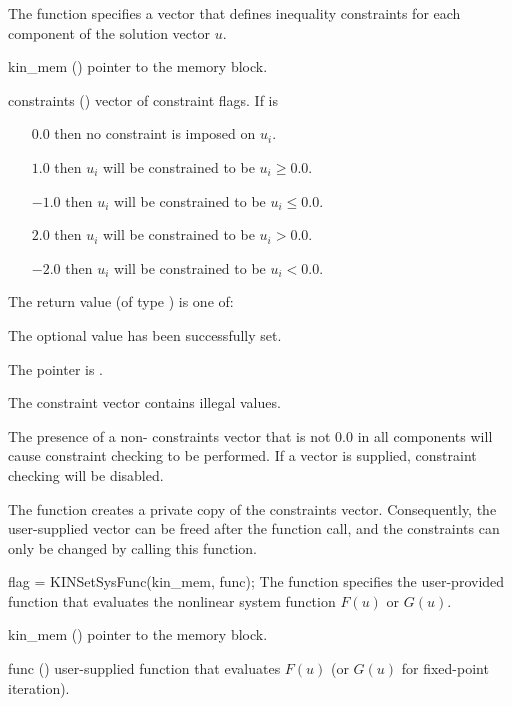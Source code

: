 {
  The function  specifies a vector that defines
  inequality constraints for each component of the solution vector $u$.
}
{
  \begin{args}[constraints]
  \item[kin\_mem] ()
    pointer to the {\kinsol} memory block.
  \item[constraints] ()
    vector of constraint flags. If  is
    \begin{itemize}
    \item[$0.0$] then no constraint is imposed on $u_i$.
    \item[$1.0$] then $u_i$ will be constrained to be $u_i \ge 0.0$.
    \item[$-1.0$] then $u_i$ will be constrained to be $u_i \le 0.0$.
    \item[$2.0$] then $u_i$ will be constrained to be $u_i > 0.0$.
    \item[$-2.0$] then $u_i$ will be constrained to be $u_i < 0.0$.
    \end{itemize}
  \end{args}
}
{
  The return value  (of type ) is one of:
  \begin{args}
  \item[\Id{KIN\_SUCCESS}]
    The optional value has been successfully set.
  \item[\Id{KIN\_MEM\_NULL}]
    The  pointer is .
  \item[\Id{KIN\_ILL\_INPUT}]
    The constraint vector contains illegal values.
  \end{args}
}
{
  The presence of a non- constraints vector that is not $0.0$ in
  all components will cause constraint checking to be performed. If a 
  vector is supplied, constraint checking will be disabled.

  The function creates a private copy of the constraints vector. Consequently,
  the user-supplied vector can be freed after the function call, and
  the constraints can only be changed by calling this function.
}
{
flag = KINSetSysFunc(kin\_mem, func);
}
{
  The function  specifies the user-provided function
  that evaluates the nonlinear system function $F(u)$ or $G(u)$.
}
{
  \begin{args}
  \item[kin\_mem] ()
    pointer to the {\kinsol} memory block.
  \item[func] ()
    user-supplied function that evaluates $F(u)$ (or $G(u)$ for fixed-point
    iteration).
  \end{args}
}
